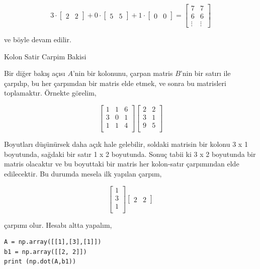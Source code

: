 \documentclass[12pt,fleqn]{article}\usepackage{../../common}
\begin{document}
$$ 
3 \cdot
\left[\begin{array}{cc}
2 & 2
\end{array}\right] +
0 \cdot
\left[\begin{array}{cc}
5 & 5
\end{array}\right] + 
1 \cdot
\left[\begin{array}{cc}
0 & 0
\end{array}\right] 
=
\left[\begin{array}{cc}
7 & 7 \\
6 & 6 \\
\vdots & \vdots
\end{array}\right] 
$$

ve böyle devam edilir.

Kolon Satir Carpim Bakisi

Bir diğer bakış açısı $A$'nin bir kolonunu, çarpan matris $B$'nin bir satırı ile
çarpılıp, bu her çarpımdan bir matris elde etmek, ve sonra bu matrisleri
toplamaktır. Örnekte görelim,

$$
\left[\begin{array}{ccc}
1 & 1 & 6 \\
3 & 0 & 1 \\
1 & 1 & 4 \\
\end{array}\right]
\left[\begin{array}{ccc}
2 & 2  \\
3 & 1  \\
9 & 5  \\
\end{array}\right]
$$

Boyutları düşünürsek daha açık hale gelebilir, soldaki matrisin bir kolonu 3 x 1
boyutunda, sağdaki bir satır 1 x 2 boyutunda. Sonuç tabii ki 3 x 2 boyutunda bir
matris olacaktır ve bu boyuttaki bir matris her kolon-satır çarpımından elde
edilecektir. Bu durumda mesela ilk yapılan çarpım,

$$
\left[\begin{array}{ccc}
1  \\
3  \\
1  \\
\end{array}\right]
\left[\begin{array}{ccc}
2 & 2 
\end{array}\right]
$$

çarpımı olur. Hesabı altta yapalım,

\begin{verbatim}
A = np.array([[1],[3],[1]])
b1 = np.array([[2, 2]])
print (np.dot(A,b1))
\end{verbatim}
\end{document}
